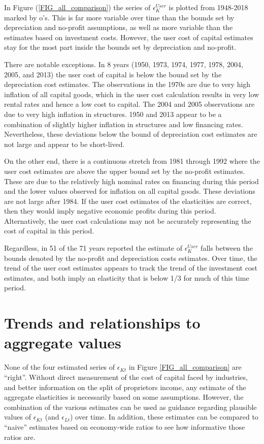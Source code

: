 \documentclass[11pt]{article}
\begin{document}
In Figure (\ref{FIG_all_comparison}) the series of $\epsilon_K^{User}$ is plotted from 1948-2018 marked by o's. This is far more variable over time than the bounds set by depreciation and no-profit assumptions, as well as more variable than the estimates based on investment costs. However, the user cost of capital estimates stay for the most part inside the bounds set by depreciation and no-profit.

There are notable exceptions. In 8 years (1950, 1973, 1974, 1977, 1978, 2004, 2005, and 2013) the user cost of capital is below the bound set by the depreciation cost estimates. The observations in the 1970s are due to very high inflation of all capital goods, which in the user cost calculation results in very low rental rates and hence a low cost to capital. The 2004 and 2005 observations are due to very high inflation in structures. 1950 and 2013 appear to be a combination of slightly higher inflation in structures and low financing rates. Nevertheless, these deviations below the bound of depreciation cost estimates are not large and appear to be short-lived. 

On the other end, there is a continuous stretch from 1981 through 1992 where the user cost estimates are above the upper bound set by the no-profit estimates. These are due to the relatively high nominal rates on financing during this period and the lower values observed for inflation on all capital goods. These deviations are not large after 1984. If the user cost estimates of the elasticities are correct, then they would imply negative economic profits during this period. Alternatively, the user cost calculations may not be accurately representing the cost of capital in this period.

Regardless, in 51 of the 71 years reported the estimate of $\epsilon_K^{User}$ falls between the bounds denoted by the no-profit and depreciation costs estimates. Over time, the trend of the user cost estimates appears to track the trend of the investment cost estimates, and both imply an elasticity that is below 1/3 for much of this time period. 

\section{Trends and relationships to aggregate values}\label{SEC_trends}
None of the four estimated series of $\epsilon_{Kt}$ in Figure \ref{FIG_all_comparison} are ``right''. Without direct measurement of the cost of capital faced by industries, and better information on the split of proprietors income, any estimate of the aggregate elasticities is necessarily based on some assumptions. However, the combination of the various estimates can be used as guidance regarding plausible values of $\epsilon_{Kt}$ (and $\epsilon_{Lt}$) over time. In addition, these estimates can be compared to ``naive'' estimates based on economy-wide ratios to see how informative those ratios are.
\end{document}
